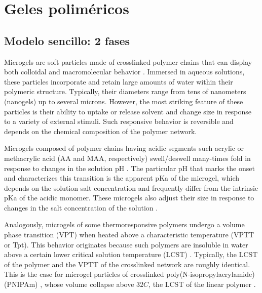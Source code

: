 
\chapter{Geles polim\'ericos} %

\label{Chapter3} %


\newcommand{\keyword}[1]{\textbf{#1}}
\newcommand{\tabhead}[1]{\textbf{#1}}
\newcommand{\code}[1]{\texttt{#1}}
\newcommand{\file}[1]{\texttt{\bfseries#1}}
\newcommand{\option}[1]{\texttt{\itshape#1}}


\section{Modelo sencillo: 2 fases}

Microgels are soft particles made of crosslinked polymer chains that can display both colloidal and macromolecular behavior .
Immersed in aqueous solutions, these particles incorporate and retain large amounts of water within their polymeric structure.
Typically, their diameters range from tens of nanometers (nanogels) up to several microns.
However, the most striking feature of these particles is their ability to uptake or release solvent and change size in response to a variety of external stimuli.
Such responsive behavior is reversible and depends on the chemical composition of the polymer network.


Microgels composed of polymer chains having acidic segments such acrylic or methacrylic acid (AA and MAA, respectively) swell/deswell many-times fold in response to changes in the solution pH .
The particular pH that marks the onset and characterizes this transition is the apparent pKa of the microgel, which depends on the solution salt concentration and frequently differ from the intrinsic pKa of the acidic monomer.
These microgels also adjust their size in response to changes in the salt concentration of the solution \addcite[snowden1996].




Analogously, microgels of some thermoresponsive polymers undergo a volume phase transition (VPT) when heated above a characteristic temperature (VPTT or Tpt).
This behavior originates because such polymers are insoluble in water above a certain lower critical solution temperature (LCST) \addcite[Kawaguch2020].
Typically, the LCST of the polymer and the VPTT of the crosslinked network are roughly identical.
This is the case for microgel particles of crosslinked poly(N-isopropylacrylamide) (PNIPAm) \addcite[Pelton1986], whose volume collapse above $32 C$, the LCST of the linear polymer \addcite[Schild1992].

